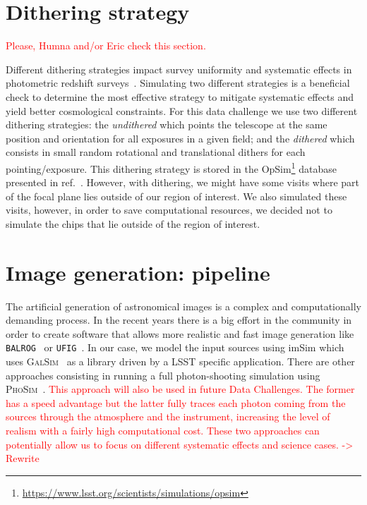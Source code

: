 \documentclass[\docopts]{\docclass}
\begin{document}
\section{Dithering strategy}
\label{sec:dithering}
\textcolor{red}{Please, Humna and/or Eric check this section.}

Different dithering strategies impact survey uniformity and systematic effects in photometric redshift surveys~\citep{2016ApJ...829...50A}. Simulating two different strategies is a beneficial check to determine the most effective strategy to mitigate systematic effects and yield better cosmological constraints. For this data challenge we use two different dithering strategies: the \textit{undithered} which points the telescope at the same position and orientation for all exposures in a given field; and the \textit{dithered} which consists in small random rotational and translational dithers for each pointing/exposure. This dithering strategy is stored in the OpSim\footnote{\url{https://www.lsst.org/scientists/simulations/opsim}} database presented in ref.~\citep{2016ApJ...829...50A}. However, with dithering, we might have some visits where part of the focal plane lies outside of our region of interest. We also simulated these visits, however, in order to save computational resources, we decided not to simulate the chips that lie outside of the region of interest.
\section{Image generation: pipeline}
\label{sec:image_generation_pipeline}

The artificial generation of astronomical images is a complex and computationally demanding process. In the recent
years there is a big effort in the community in order to create software that allows more realistic and fast image
generation like \texttt{BALROG}~\citep{2016MNRAS.457..786S} or \texttt{UFIG}~\citep{2016ApJ...817...25B}. In our case, we model the input sources using imSim which uses \textsc{GalSim}~\citep{2015A&C....10..121R} as a library driven
by a LSST specific application. There are other approaches consisting in
running a full photon-shooting simulation using \textsc{PhoSim}~\citep{2015ApJS..218...14P}. \textcolor{red}{This approach will also be used in future Data Challenges. The former has a speed
advantage but the latter fully traces each photon coming from the sources through the atmosphere and the instrument,
increasing the level of realism with a fairly high computational cost. These two approaches can potentially allow us to focus on different systematic effects and science cases. -> Rewrite}
\end{document}
